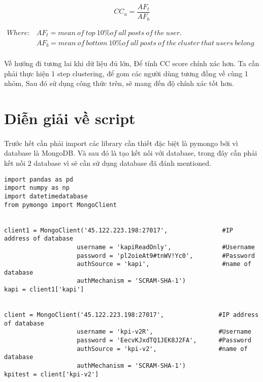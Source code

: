 \documentclass[12pt]{article}
\numberwithin{equation}{section}
\begin{document}
$$ CC_u = \frac{AF_t}{AF_b} $$

$
\begin{aligned}
Where: & AF_t = mean\ of\ top\ 10\% of\ all\ posts\ of\ the\ user.\\
		& AF_b = mean\ of\ bottom\ 10\% of\ all\ posts\ of\ the\ cluster\ that\ users\ belong\
\end{aligned}
$

\paragraph{} Về hướng đi tương lai khi dữ liệu đủ lớn, Để tính CC score chính xác hơn. Ta cần phải thực hiện 1 step clustering, để gom các người dùng tương đồng về cùng 1 nhóm, Sau đó sử dụng công thức trên, sẽ mang đến độ chính xác tốt hơn.
\section{Diễn giải về script}

\paragraph{} Trước hết cần phải import các library cần thiết đặc biệt là pymongo bởi vì database là MongoDB. Và sau đó là tạo kết nối với database, trong đây cần phải kết nối 2 database vì sẽ cần sử dụng database đã đánh mentioned.

\begin{lstlisting}
import pandas as pd
import numpy as np
import datetimedatabase
from pymongo import MongoClient


client1 = MongoClient('45.122.223.198:27017',               #IP address of database
                    username = 'kapiReadOnly',              #Username
                    password = 'pl2oieAt9#tnWV!Yc0',        #Password
                    authSource = 'kapi',                    #name of database
                    authMechanism = 'SCRAM-SHA-1')
kapi = client1['kapi']


client = MongoClient('45.122.223.198:27017',               #IP address of database
                    username = 'kpi-v2R',                  #Username
                    password = 'EecvKJxdTQ1JEK8J2FA',      #Password
                    authSource = 'kpi-v2',                 #name of database
                    authMechanism = 'SCRAM-SHA-1')
kpitest = client['kpi-v2']

\end{lstlisting}
\end{document}
